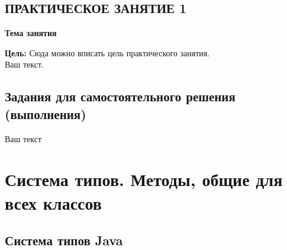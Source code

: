 \newpage%
\section*{ПРАКТИЧЕСКОЕ ЗАНЯТИЕ 1}%
 \vspace{-10pt}%
\begin{center}%
 {\bf%
 Тема занятия}
\end{center}%

{\bf Цель:} Сюда можно вписать цель практического занятия.
\\%

Ваш текст.

\newpage%
\section*{Задания для самостоятельного решения (выполнения)}%

Ваш текст

\newpage%


\newpage %
\chapter{Система типов. Методы, общие для всех классов}

\section{Система типов Java}


